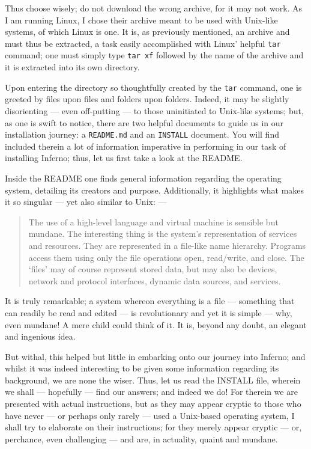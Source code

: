 \documentclass[a5paper,twoside,12pt]{report}
\begin{document}
Thus choose wisely; do not download the wrong archive, for it may not work. As I am running Linux, I chose their archive meant to be used with Unix-like systems, of which Linux is one. It is, as previously mentioned, an archive and must thus be extracted, a task easily accomplished with Linux' helpful \texttt{tar} command; one must simply type \texttt{tar xf} followed by the name of the archive and it is extracted into its own directory.

Upon entering the directory so thoughtfully created by the \texttt{tar} command, one is greeted by files upon files and folders upon folders. Indeed, it may be slightly disorienting — even off-putting — to those uninitiated to Unix-like systems; but, as one is swift to notice, there are two helpful documents to guide us in our installation journey: a \texttt{README.md} and an \texttt{INSTALL} document. You will find included therein a lot of information imperative in performing in our task of installing Inferno; thus, let us first take a look at the README.

Inside the README one finds general information regarding the operating system, detailing its creators and purpose. Additionally, it highlights what makes it so singular — yet also similar to Unix: —

\begin{quote}
  The use of a high-level language and virtual machine is sensible but mundane. The interesting thing is the
  system’s representation of services and resources. They are represented in a file-like name hierarchy.
  Programs access them using only the file operations open, read/write, and close. The ‘files’ may of course
  represent stored data, but may also be devices, network and protocol interfaces, dynamic data sources, and
  services.
\end{quote}

It is truly remarkable; a system whereon everything is a file — something that can readily be read and edited — is revolutionary and yet it is simple — why, even mundane! A mere child could think of it. It is, beyond any doubt, an elegant and ingenious idea.

But withal, this helped but little in embarking onto our journey into Inferno; and whilst it was indeed interesting to be given some information regarding its background, we are none the wiser. Thus, let us read the INSTALL file, wherein we shall — hopefully — find our answers; and indeed we do!
For therein we are presented with actual instructions, but as they may appear cryptic to those who have never — or perhaps only rarely — used a Unix-based operating system, I shall try to elaborate on their instructions; for they merely appear cryptic — or, perchance, even challenging — and are, in actuality, quaint and mundane.
\end{document}
